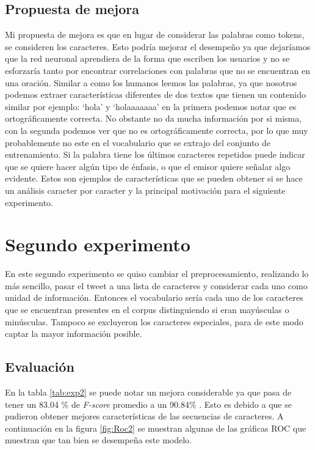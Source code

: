 \subsection{Propuesta de mejora}

\par Mi propuesta de mejora es que en lugar de considerar las palabras como tokens, se consideren los caracteres. Esto podría mejorar el desempeño ya que dejaríamos que la red neuronal aprendiera de la forma que escriben los usuarios y no se esforzaría tanto por encontrar correlaciones con palabras que no se encuentran en una oración. Similar a como los humanos leemos las palabras, ya que nosotros podemos extraer características diferentes de dos textos que tienen un contenido similar por ejemplo: `hola' y `holaaaaaaa' en la primera podemos notar que es ortográficamente correcta. No obstante no da mucha información por si misma, con la segunda podemos ver que no es ortográficamente correcta, por lo que muy probablemente no este en el vocabulario que se extrajo del conjunto de entrenamiento. Si la palabra tiene los últimos caracteres repetidos puede indicar que se quiere hacer algún tipo de énfasis, o que el emisor quiere señalar algo evidente. Estos son ejemplos de características que se pueden obtener si se hace un análisis caracter por caracter y la principal motivación para el siguiente experimento.

\section{Segundo experimento}
\par En este segundo experimento se quiso cambiar el preprocesamiento, realizando lo más sencillo, pasar el tweet a una lista de caracteres y considerar cada uno como unidad de información. Entonces el vocabulario sería cada uno de los caracteres que se encuentran presentes en el corpus distinguiendo si eran mayúsculas o minúsculas. Tampoco se excluyeron los caracteres especiales, para de este modo captar la mayor información posible.
\subsection{Evaluación}
\begin{center}
	
\end{center}


\par En la tabla \ref{tab:exp2} se puede notar un mejora considerable ya que pasa de tener un 83.04 \% de \textit{F-score} promedio a un 90.84\% . Esto es debido a que se pudieron obtener mejores características de las secuencias de caracteres. A continuación en la figura \ref{fig:Roc2} se muestran algunas de las gráficas ROC que muestran que tan bien se desempeña este modelo.

